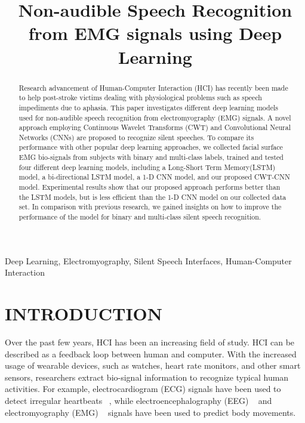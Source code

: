 \documentclass{article}
\title{Non-audible Speech Recognition from EMG signals using Deep Learning}
\begin{document}
%
\maketitle
%
\begin{abstract}
Research advancement of Human-Computer Interaction (HCI) has recently been made to help post-stroke victims dealing with physiological problems such as speech impediments due to aphasia. This paper investigates different deep learning models used for non-audible speech recognition from electromyography (EMG) signals. A novel approach employing Continuous Wavelet Transforms (CWT) and Convolutional Neural Networks (CNNs) are proposed to recognize silent speeches. To compare its performance with other popular deep learning approaches, we collected facial surface EMG bio-signals from subjects with binary and multi-class labels, trained and tested four different deep learning models, including a Long-Short Term Memory(LSTM) model, a bi-directional LSTM model, a 1-D CNN model, and our proposed CWT-CNN model.  Experimental results show that our proposed approach performs better than the LSTM models, but is less efficient than the 1-D CNN model on our collected data set. In comparison with previous research,  we gained insights on how to improve the performance of the model for binary and multi-class silent speech recognition. 
\end{abstract}
%
\begin{keywords}
Deep Learning, Electromyography, Silent Speech Interfaces, Human-Computer Interaction
\end{keywords}
%
\section{INTRODUCTION}
\label{sec:INTRODUCTION}

Over the past few years, HCI has been an increasing field of study. HCI can be described as a feedback loop between human and computer. With the increased usage of wearable devices, such as watches, heart rate monitors, and other smart sensors, researchers extract bio-signal information to recognize typical human activities.  For example, electrocardiogram (ECG) signals have been used to detect irregular heartbeats ~\cite{noauthor_classify_nodate}, while electroencephalography (EEG) ~\cite{eltvik_deep_nodate} and electromyography (EMG)  ~\cite{altamirano_emg_nodate} signals have been used to predict body movements. 
\end{document}
